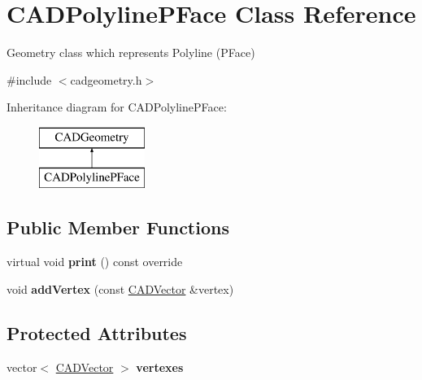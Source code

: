 \hypertarget{class_c_a_d_polyline_p_face}{}\section{C\+A\+D\+Polyline\+P\+Face Class Reference}
\label{class_c_a_d_polyline_p_face}


Geometry class which represents Polyline (P\+Face)  




{\ttfamily \#include $<$cadgeometry.\+h$>$}

Inheritance diagram for C\+A\+D\+Polyline\+P\+Face\+:\begin{figure}[H]
\begin{center}
\leavevmode
\includegraphics[height=2.000000cm]{class_c_a_d_polyline_p_face}
\end{center}
\end{figure}
\subsection*{Public Member Functions}
\begin{DoxyCompactItemize}
\item 
virtual void {\bfseries print} () const  override\hypertarget{class_c_a_d_polyline_p_face_a0215a825620746b040d2773b4504052d}{}\label{class_c_a_d_polyline_p_face_a0215a825620746b040d2773b4504052d}

\item 
void {\bfseries add\+Vertex} (const \hyperlink{class_c_a_d_vector}{C\+A\+D\+Vector} \&vertex)\hypertarget{class_c_a_d_polyline_p_face_ab43e61b8671cac0a878f856edefc6d7f}{}\label{class_c_a_d_polyline_p_face_ab43e61b8671cac0a878f856edefc6d7f}

\end{DoxyCompactItemize}
\subsection*{Protected Attributes}
\begin{DoxyCompactItemize}
\item 
vector$<$ \hyperlink{class_c_a_d_vector}{C\+A\+D\+Vector} $>$ {\bfseries vertexes}\hypertarget{class_c_a_d_polyline_p_face_a4f41b8736cf5548288a64c6867cc6886}{}\label{class_c_a_d_polyline_p_face_a4f41b8736cf5548288a64c6867cc6886}

\end{DoxyCompactItemize}
